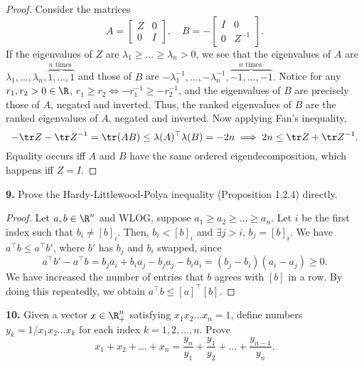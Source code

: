 \documentclass[../borwein-lewis_notes.tex]{subfiles}
\begin{document}
\begin{proof}
Consider the matrices 
\begin{equation*}
A=
\begin{bmatrix}
Z & 0 \\
0 & I
\end{bmatrix},
\quad B= -
\begin{bmatrix}
I & 0 \\
0 & Z^{-1}
\end{bmatrix}.
\end{equation*}
If the eigenvalues of $Z$ are $\lambda_1 \geq \ldots \geq \lambda_n > 0$,
we see that the eigenvalues of $A$ are $\lambda_1,\ldots,\lambda_n, 
\overbrace{1,\ldots, 1}^{n\text{ times }}$ and those of $B$ are 
$-\lambda_1^{-1},\ldots,-\lambda_n^{-1}, \overbrace{-1,\ldots,-1}^{n
\text{ times }}.$ Notice for any $r_1,r_2>0\in\R$, 
$r_1 \geq r_2 \iff -r_1^{-1}\geq -r_2^{-1}$, and the eigenvalues of 
$B$ are precisely those of $A$, negated and inverted. Thus, the ranked 
eigenvalues of $B$ are the ranked eigenvalues of $A$, negated and 
inverted. Now applying Fan's inequality, 
\begin{equation*}
-\tr Z - \tr Z^{-1} = \tr(AB) \leq \lambda(A)^\top\lambda(B) = -2n
\implies 2n \leq \tr Z + \tr Z^{-1}.
\end{equation*}
Equality occurs iff $A$ and $B$ have the same ordered eigendecomposition,
which happens iff $Z=I$.
\end{proof}\noindent
\textbf{9.} Prove the Hardy-Littlewood-Polya inequality (Proposition
1.2.4) directly.
\begin{proof}
Let $a,b\in\R^n$ and WLOG, suppose $a_1\geq a_2\geq\ldots\geq a_n$.
Let $i$ be the first index such that $b_i\neq [b]_i$. Then, $b_i < 
[b]_i$ and $\exists j>i,\, b_j = [b]_i$. We have 
$a^\top b \leq a^\top b'$, where $b'$ has $b_j$ and $b_i$ swapped,
since 
\begin{equation*}
a^\top b' - a^\top b = b_ja_i + b_ia_j - b_ja_j-b_ia_i
= (b_j-b_i)(a_i - a_j) \geq 0.
\end{equation*}
We have increased the number of entries that $b$ agrees with $[b]$ in 
a row. By doing this repeatedly, we obtain $a^\top b \leq 
[a]^\top[b]$.
\end{proof}\noindent
\textbf{10.} Given a vector $x\in\R_+^n$ satisfying $x_1x_2\ldots x_n=1$,
define numbers $y_k=1/x_1x_2\ldots x_k$ for each index $k=1,2,\ldots,n$.
Prove 
\begin{equation*}
x_1+x_2+\ldots+x_n= \frac{y_n}{y_1}+\frac{y_1}{y_2}+\ldots+\frac{y_{n-1}}{
y_n}.
\end{equation*}
\end{document}
